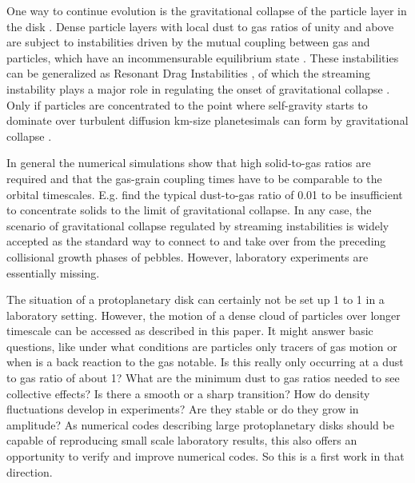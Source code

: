 One way to continue evolution is the gravitational collapse of the particle layer in the disk \citep{Safronov1969,Goldreich1973}. Dense particle layers with local dust to gas ratios of unity and above are subject to instabilities \citep{Weidenschilling1980} driven by the mutual coupling between gas and particles, which have an incommensurable equilibrium state \citep{1986Icar...67..375N}. These instabilities can be generalized as Resonant Drag Instabilities \citep{Squire2018SI}, of which the streaming instability plays a major role in regulating the onset of gravitational collapse \citep{Youdin2005, Johansen2015, simon2016, schreiber2018}. Only if particles are concentrated to the point where self-gravity starts to dominate over turbulent diffusion km-size planetesimals can form by gravitational collapse \citep{Johansen2007, 2011A&A...529A..62J, Johansen2015}.


In general the numerical simulations show that high solid-to-gas ratios are required and that the gas-grain coupling times have to be comparable to the orbital timescales. E.g. \citet{bai2010} find the typical dust-to-gas ratio of 0.01 to be insufficient to concentrate solids to the limit of gravitational collapse.
In any case, the scenario of {gravitational collapse regulated by} streaming instabilities is widely accepted as the standard way to connect to and take over from the preceding collisional growth phases of pebbles. However, laboratory experiments are essentially missing. 

{The situation of a protoplanetary disk can certainly not be set up 1 to 1 in a laboratory setting. However, the motion of a dense cloud of particles over longer timescale can be accessed as described in this paper. It might answer basic questions, like under what conditions are particles only tracers of gas motion or when is a back reaction to the gas notable. Is this really only occurring at a dust to gas ratio of about 1? {What are the minimum dust to gas ratios needed to see collective effects? Is there a smooth or a sharp transition? How do density fluctuations develop in experiments? Are they stable or do they grow in amplitude?} As numerical codes describing large protoplanetary disks should be capable of reproducing small scale laboratory results, this also offers an opportunity to verify and improve numerical codes. So this is a first work in that direction.}

